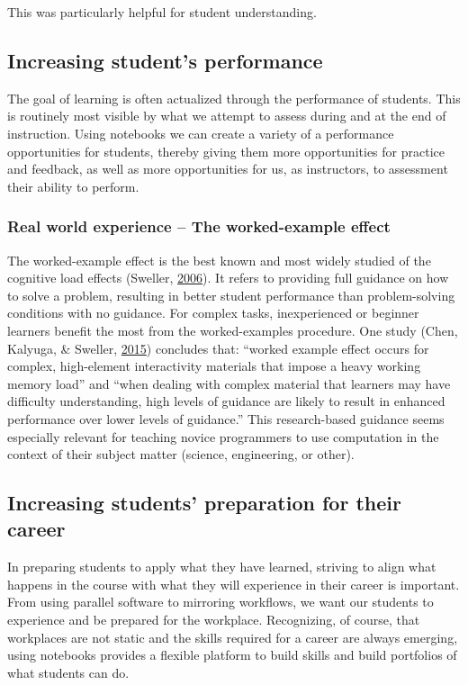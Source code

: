 \documentclass[]{book}
\begin{document}
This was particularly helpful for student understanding.

\subsection{Increasing student's
performance}\label{increasing-students-performance}

The goal of learning is often actualized through the performance of
students. This is routinely most visible by what we attempt to assess
during and at the end of instruction. Using notebooks we can create a
variety of a performance opportunities for students, thereby giving them
more opportunities for practice and feedback, as well as more
opportunities for us, as instructors, to assessment their ability to
perform.

\subsubsection{Real world experience -- The worked-example
effect}\label{real-world-experience-the-worked-example-effect}

The worked-example effect is the best known and most widely studied of
the cognitive load effects (Sweller,
\protect\hyperlink{ref-sweller2006worked}{2006}). It refers to providing
full guidance on how to solve a problem, resulting in better student
performance than problem-solving conditions with no guidance. For
complex tasks, inexperienced or beginner learners benefit the most from
the worked-examples procedure. One study (Chen, Kalyuga, \& Sweller,
\protect\hyperlink{ref-chen2015worked}{2015}) concludes that: ``worked
example effect occurs for complex, high-element interactivity materials
that impose a heavy working memory load'' and ``when dealing with
complex material that learners may have difficulty understanding, high
levels of guidance are likely to result in enhanced performance over
lower levels of guidance.'' This research-based guidance seems
especially relevant for teaching novice programmers to use computation
in the context of their subject matter (science, engineering, or other).

\subsection{Increasing students' preparation for their
career}\label{increasing-students-preparation-for-their-career}

In preparing students to apply what they have learned, striving to align
what happens in the course with what they will experience in their
career is important. From using parallel software to mirroring
workflows, we want our students to experience and be prepared for the
workplace. Recognizing, of course, that workplaces are not static and
the skills required for a career are always emerging, using notebooks
provides a flexible platform to build skills and build portfolios of
what students can do.
\end{document}
